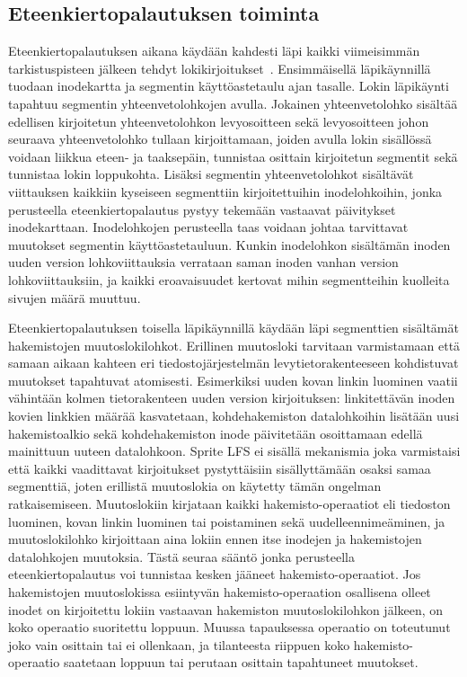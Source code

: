 \subsection{Eteenkiertopalautuksen toiminta}
Eteenkiertopalautuksen aikana käydään kahdesti läpi kaikki viimeisimmän tarkistuspisteen jälkeen tehdyt lokikirjoitukset~\cite{SpriteRosenblumThesis}.
Ensimmäisellä läpikäynnillä tuodaan inodekartta ja segmentin käyttöastetaulu ajan tasalle.
Lokin läpikäynti tapahtuu segmentin yhteenvetolohkojen avulla.
Jokainen yhteenvetolohko sisältää edellisen kirjoitetun yhteenvetolohkon levyosoitteen sekä levyosoitteen johon seuraava yhteenvetolohko tullaan kirjoittamaan,
joiden avulla lokin sisällössä voidaan liikkua eteen- ja taaksepäin, tunnistaa osittain kirjoitetun segmentit sekä tunnistaa lokin loppukohta.
Lisäksi segmentin yhteenvetolohkot sisältävät viittauksen kaikkiin kyseiseen segmenttiin kirjoitettuihin inodelohkoihin,
jonka perusteella eteenkiertopalautus pystyy tekemään vastaavat päivitykset inodekarttaan.
Inodelohkojen perusteella taas voidaan johtaa tarvittavat muutokset segmentin käyttöastetauluun.
Kunkin inodelohkon sisältämän inoden uuden version lohkoviittauksia verrataan saman inoden vanhan version lohkoviittauksiin,
ja kaikki eroavaisuudet kertovat mihin segmentteihin kuolleita sivujen määrä muuttuu.

Eteenkiertopalautuksen toisella läpikäynnillä käydään läpi segmenttien sisältämät hakemistojen muutoslokilohkot.
Erillinen muutosloki tarvitaan varmistamaan että samaan aikaan kahteen eri tiedostojärjestelmän levytietorakenteeseen kohdistuvat muutokset tapahtuvat atomisesti.
Esimerkiksi uuden kovan linkin luominen vaatii vähintään kolmen tietorakenteen uuden version kirjoituksen: linkitettävän inoden kovien linkkien määrää kasvatetaan,
kohdehakemiston datalohkoihin lisätään uusi hakemistoalkio sekä kohdehakemiston inode päivitetään osoittamaan edellä mainittuun uuteen datalohkoon.
Sprite LFS ei sisällä mekanismia joka varmistaisi että kaikki vaadittavat kirjoitukset pystyttäisiin sisällyttämään osaksi samaa segmenttiä,
joten erillistä muutoslokia on käytetty tämän ongelman ratkaisemiseen.
Muutoslokiin kirjataan kaikki hakemisto-operaatiot eli tiedoston luominen, kovan linkin luominen tai poistaminen sekä uudelleennimeäminen,
ja muutoslokilohko kirjoittaan aina lokiin ennen itse inodejen ja hakemistojen datalohkojen muutoksia.
Tästä seuraa sääntö jonka perusteella eteenkiertopalautus voi tunnistaa kesken jääneet hakemisto-operaatiot.
Jos hakemistojen muutoslokissa esiintyvän hakemisto-operaation osallisena olleet inodet on kirjoitettu lokiin
vastaavan hakemiston muutoslokilohkon jälkeen,
on koko operaatio suoritettu loppuun.
Muussa tapauksessa operaatio on toteutunut joko vain osittain tai ei ollenkaan,
ja tilanteesta riippuen koko hakemisto-operaatio saatetaan loppuun tai perutaan osittain tapahtuneet muutokset.


